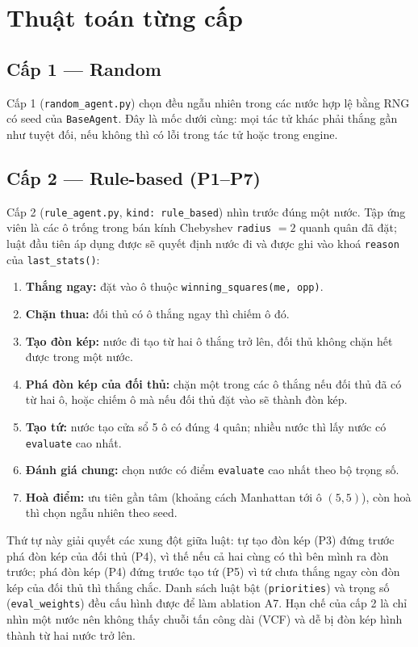 \section{Thuật toán từng cấp}
\subsection{Cấp 1 --- Random}
Cấp 1 (\texttt{random\_agent.py}) chọn đều ngẫu nhiên trong các nước hợp lệ bằng RNG có seed của \texttt{BaseAgent}. Đây là mốc dưới cùng: mọi tác tử khác phải thắng gần như tuyệt đối, nếu không thì có lỗi trong tác tử hoặc trong engine.
\subsection{Cấp 2 --- Rule-based (P1--P7)}
Cấp 2 (\texttt{rule\_agent.py}, \texttt{kind: rule\_based}) nhìn trước đúng một nước. Tập ứng viên là các ô trống trong bán kính Chebyshev \texttt{radius} $=2$ quanh quân đã đặt; luật đầu tiên áp dụng được sẽ quyết định nước đi và được ghi vào khoá \texttt{reason} của \texttt{last\_stats()}:
\begin{enumerate}
  \item[\textbf{P1}] \textbf{Thắng ngay:} đặt vào ô thuộc \texttt{winning\_squares(me, opp)}.
  \item[\textbf{P2}] \textbf{Chặn thua:} đối thủ có ô thắng ngay thì chiếm ô đó.
  \item[\textbf{P3}] \textbf{Tạo đòn kép:} nước đi tạo từ hai ô thắng trở lên, đối thủ không chặn hết được trong một nước.
  \item[\textbf{P4}] \textbf{Phá đòn kép của đối thủ:} chặn một trong các ô thắng nếu đối thủ đã có từ hai ô, hoặc chiếm ô mà nếu đối thủ đặt vào sẽ thành đòn kép.
  \item[\textbf{P5}] \textbf{Tạo tứ:} nước tạo cửa sổ 5 ô có đúng 4 quân; nhiều nước thì lấy nước có \texttt{evaluate} cao nhất.
  \item[\textbf{P6}] \textbf{Đánh giá chung:} chọn nước có điểm \texttt{evaluate} cao nhất theo bộ trọng số.
  \item[\textbf{P7}] \textbf{Hoà điểm:} ưu tiên gần tâm (khoảng cách Manhattan tới ô $(5,5)$), còn hoà thì chọn ngẫu nhiên theo seed.
\end{enumerate}
Thứ tự này giải quyết các xung đột giữa luật: tự tạo đòn kép (P3) đứng trước phá đòn kép của đối thủ (P4), vì thế nếu cả hai cùng có thì bên mình ra đòn trước; phá đòn kép (P4) đứng trước tạo tứ (P5) vì tứ chưa thắng ngay còn đòn kép của đối thủ thì thắng chắc. Danh sách luật bật (\texttt{priorities}) và trọng số (\texttt{eval\_weights}) đều cấu hình được để làm ablation A7. Hạn chế của cấp 2 là chỉ nhìn một nước nên không thấy chuỗi tấn công dài (VCF) và dễ bị đòn kép hình thành từ hai nước trở lên.
